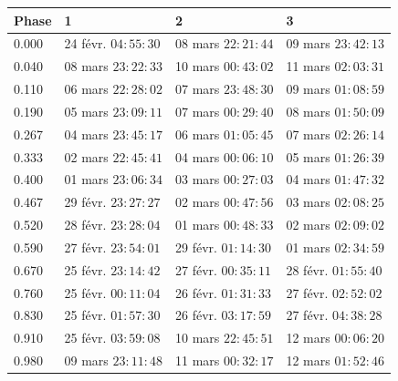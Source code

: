 \documentclass[10pt,french, openany]{book}
\begin{document}
           \begin{table}
    
            \centering
            
            \begin{tabular}{|l|l|l|l|}
                \toprule
                {}Phase&                    1 &                    2 &                    3 \\
                \midrule
                0.000 &  24 févr. $04{:}55{:}30$ &   08 mars $22{:}21{:}44$ &   09 mars $23{:}42{:}13$ \\
                0.040 &   08 mars $23{:}22{:}33$ &   10 mars $00{:}43{:}02$ &   11 mars $02{:}03{:}31$ \\
                0.110 &   06 mars $22{:}28{:}02$ &   07 mars $23{:}48{:}30$ &   09 mars $01{:}08{:}59$ \\
                0.190 &   05 mars $23{:}09{:}11$ &   07 mars $00{:}29{:}40$ &   08 mars $01{:}50{:}09$ \\
                0.267 &   04 mars $23{:}45{:}17$ &   06 mars $01{:}05{:}45$ &   07 mars $02{:}26{:}14$ \\
                0.333 &   02 mars $22{:}45{:}41$ &   04 mars $00{:}06{:}10$ &   05 mars $01{:}26{:}39$ \\
                0.400 &   01 mars $23{:}06{:}34$ &   03 mars $00{:}27{:}03$ &   04 mars $01{:}47{:}32$ \\
                0.467 &  29 févr. $23{:}27{:}27$ &   02 mars $00{:}47{:}56$ &   03 mars $02{:}08{:}25$ \\
                0.520 &  28 févr. $23{:}28{:}04$ &   01 mars $00{:}48{:}33$ &   02 mars $02{:}09{:}02$ \\
                0.590 &  27 févr. $23{:}54{:}01$ &  29 févr. $01{:}14{:}30$ &   01 mars $02{:}34{:}59$ \\
                0.670 &  25 févr. $23{:}14{:}42$ &  27 févr. $00{:}35{:}11$ &  28 févr. $01{:}55{:}40$ \\
                0.760 &  25 févr. $00{:}11{:}04$ &  26 févr. $01{:}31{:}33$ &  27 févr. $02{:}52{:}02$ \\
                0.830 &  25 févr. $01{:}57{:}30$ &  26 févr. $03{:}17{:}59$ &  27 févr. $04{:}38{:}28$ \\
                0.910 &  25 févr. $03{:}59{:}08$ &   10 mars $22{:}45{:}51$ &   12 mars $00{:}06{:}20$ \\
                0.980 &   09 mars $23{:}11{:}48$ &   11 mars $00{:}32{:}17$ &   12 mars $01{:}52{:}46$ \\
                \bottomrule
            \end{tabular}


\end{table}
\end{document}
